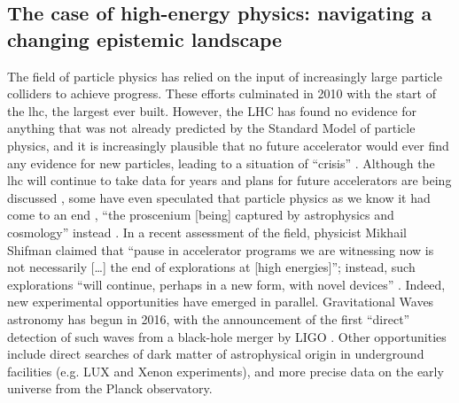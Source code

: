 \documentclass{article}
\begin{document}
\subsection{\label{sec:hep}The case of high-energy physics: navigating a changing epistemic landscape}

The field of particle physics has relied on the input of increasingly large particle colliders to achieve progress. These efforts culminated in 2010 with the start of the \gls{lhc}, the largest ever built. However, the LHC has found no evidence for anything that was not already predicted by the Standard Model of particle physics, and it is increasingly plausible that no future accelerator would ever find any evidence for new particles, leading to a situation of ``crisis'' \citep{susy_crisis}. Although the \gls{lhc} will continue to take data for years and plans for future accelerators are being discussed \citep{Roser2023}, some have even speculated that particle physics as we know it had come to an end \citep{Harlander2023,Kosyakov2023}%
, ``the proscenium
[being] captured by astrophysics and cosmology'' instead \citep{Kosyakov2023}. In a recent assessment of the field, physicist Mikhail Shifman claimed that ``pause in accelerator programs we are witnessing now is not necessarily [\dots] the end of explorations at [high energies]''; instead, such explorations ``will continue, perhaps in a new form, with novel devices'' \citep{Shifman2020}. Indeed, new experimental opportunities have emerged in parallel. Gravitational Waves astronomy has begun in 2016, with the announcement of the first ``direct'' detection of such waves from a black-hole merger by LIGO \citep{Abbott2016}. Other opportunities include direct searches of dark matter of astrophysical origin in underground facilities (e.g. LUX and Xenon experiments), and more precise data on the early universe from the Planck observatory. %
\end{document}
